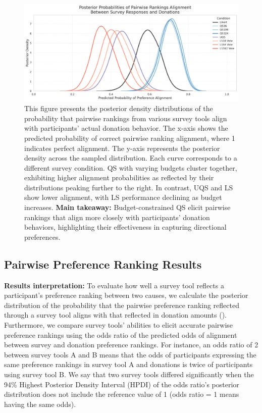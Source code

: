 \begin{figure}[h]
    \centering
    \includegraphics[width=\textwidth]{content/image/overlapping_density_custom_palette.pdf}
    \caption{
    This figure presents the posterior density distributions of the probability that pairwise rankings from various survey tools align with participants' actual donation behavior. The x-axis shows the predicted probability of correct pairwise ranking alignment, where 1 indicates perfect alignment. The y-axis represents the posterior density across the sampled distribution. Each curve corresponds to a different survey condition. QS with varying budgets cluster together, exhibiting higher alignment probabilities as reflected by their distributions peaking further to the right. In contrast, UQS and LS show lower alignment, with LS performance declining as budget increases. \textbf{Main takeaway:} Budget-constrained QS elicit pairwise rankings that align more closely with participants' donation behaviors, highlighting their effectiveness in capturing directional preferences.}
    \label{fig:ranking_posterior}
\end{figure}

\subsection{Pairwise Preference Ranking Results}
\label{sec:result_1}

\textbf{Results interpretation: }To evaluate how well a survey tool reflects a participant's preference ranking between two causes, we calculate the posterior distribution of the probability that the pairwise preference ranking reflected through a survey tool aligns with that reflected in donation amounts (). Furthermore, we compare survey tools' abilities to elicit accurate pairwise preference rankings using the odds ratio of the predicted odds of alignment between survey and donation preference rankings. For instance, an odds ratio of 2 between survey tools A and B means that the odds of participants expressing the same preference rankings in survey tool A and donations is twice of participants using survey tool B. We say that two survey tools differed significantly when the 94\% Highest Posterior Density Interval (HPDI) of the odds ratio's posterior distribution does not include the reference value of 1 (odds ratio = 1 means having the same odds). 

